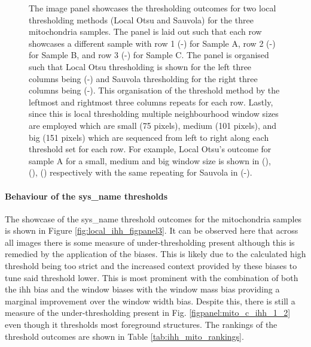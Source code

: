 \begin{figure}[h!]
    \caption[Image panel showcasing the thresholding outcome of mitochondria samples using local thresholding methods for different window sizes]{The image panel showcases the thresholding outcomes for two local thresholding methods (Local Otsu and Sauvola) for the three mitochondria samples. The panel is laid out such that each row showcases a different sample with row 1 (-) for Sample A, row 2 (-) for Sample B, and row 3 (-) for Sample C. The panel is organised such that Local Otsu thresholding is shown for the left three columns being (-) and Sauvola thresholding for the right three columns being (-). This organisation of the threshold method by the leftmost and rightmost three columns repeats for each row. Lastly, since this is local thresholding multiple neighbourhood window sizes are employed which are small (75 pixels), medium (101 pixels), and big (151 pixels) which are sequenced from left to right along each threshold set for each row. For example, Local Otsu's outcome for sample A for a small, medium and big window size is shown in (), (), () respectively with the same repeating for Sauvola in (-).}
    \label{fig:local_figpanel3}
\end{figure}

\paragraph{Behaviour of the \gls{sys_name} thresholds}
The showcase of the \gls{sys_name} threshold outcomes for the mitochondria samples is shown in Figure \ref{fig:local_ihh_figpanel3}. It can be observed here that across all images there is some measure of under-thresholding present although this is remedied by the application of the biases. This is likely due to the calculated high threshold being too strict and the increased context provided by these biases to tune said threshold lower. This is most prominent with the combination of both the \gls{ihh} bias and the window biases with the window mass bias providing a marginal improvement over the window width bias. Despite this, there is still a measure of the under-thresholding present in Fig. \ref{figpanel:mito_c_ihh_1_2} even though it thresholds most foreground structures. The rankings of the threshold outcomes are shown in Table \ref{tab:ihh_mito_rankings}.

